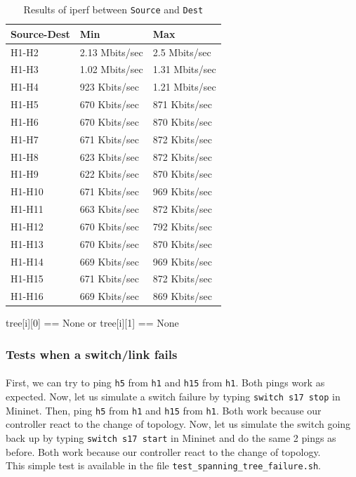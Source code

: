 \documentclass[a4paper, 11pt, oneside]{article}
\begin{document}
\begin{table}[H]
    \centering
    \begin{tabular}{|l|l|l|}
    \hline
    \textbf{Source-Dest} & \textbf{Min}   & \textbf{Max}   \\ \hline
    H1-H2                & 2.13 Mbits/sec & 2.5 Mbits/sec  \\ \hline
    H1-H3                & 1.02 Mbits/sec & 1.31 Mbits/sec \\ \hline
    H1-H4                & 923 Kbits/sec  & 1.21 Mbits/sec \\ \hline
    H1-H5                & 670 Kbits/sec  & 871 Kbits/sec  \\ \hline
    H1-H6                & 670 Kbits/sec  & 870 Kbits/sec  \\ \hline
    H1-H7                & 671 Kbits/sec  & 872 Kbits/sec  \\ \hline
    H1-H8                & 623 Kbits/sec  & 872 Kbits/sec  \\ \hline
    H1-H9                & 622 Kbits/sec  & 870 Kbits/sec  \\ \hline
    H1-H10               & 671 Kbits/sec  & 969 Kbits/sec  \\ \hline
    H1-H11               & 663 Kbits/sec  & 872 Kbits/sec  \\ \hline
    H1-H12               & 670 Kbits/sec  & 792 Kbits/sec  \\ \hline
    H1-H13               & 670 Kbits/sec  & 870 Kbits/sec  \\ \hline
    H1-H14               & 669 Kbits/sec  & 969 Kbits/sec  \\ \hline
    H1-H15               & 671 Kbits/sec  & 872 Kbits/sec  \\ \hline
    H1-H16               & 669 Kbits/sec  & 869 Kbits/sec  \\ \hline
    \end{tabular}
    \caption{Results of iperf between \texttt{Source} and \texttt{Dest}}
    \label{table:ST_bw}
    \end{table}

tree[i][0] == None or tree[i][1] == None
\subsubsection{Tests when a switch/link fails}
\paragraph{}First, we can try to ping \texttt{h5} from \texttt{h1} and \texttt{h15} from \texttt{h1}. Both pings work as expected. Now, let us simulate a switch failure by typing \texttt{switch s17 stop} in Mininet. Then, ping \texttt{h5} from \texttt{h1} and \texttt{h15} from \texttt{h1}. Both work because our controller react to the change of topology. Now, let us simulate the switch going back up by typing \texttt{switch s17 start} in Mininet and do the same 2 pings as before. Both work because our controller react to the change of topology.\\
This simple test is available in the file \texttt{test\_spanning\_tree\_failure.sh}.
\end{document}
